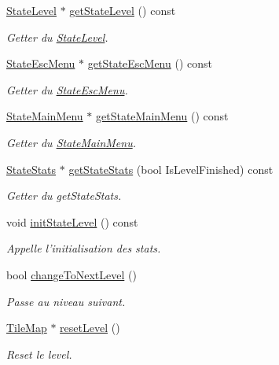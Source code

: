 \begin{DoxyCompactItemize}
\hyperlink{class_state_level}{State\+Level} $\ast$ \hyperlink{class_jeu_a2632dcd588e4cfb6cc38076cb807190c}{get\+State\+Level} () const 
\begin{DoxyCompactList}\small\item\em Getter du \hyperlink{class_state_level}{State\+Level}. \end{DoxyCompactList}\item 
\hyperlink{class_state_esc_menu}{State\+Esc\+Menu} $\ast$ \hyperlink{class_jeu_af4e8d3d39a32c20fed3e397a6e2cd939}{get\+State\+Esc\+Menu} () const 
\begin{DoxyCompactList}\small\item\em Getter du \hyperlink{class_state_esc_menu}{State\+Esc\+Menu}. \end{DoxyCompactList}\item 
\hyperlink{class_state_main_menu}{State\+Main\+Menu} $\ast$ \hyperlink{class_jeu_a09945f1c10ce230032fcdc3f25d19171}{get\+State\+Main\+Menu} () const 
\begin{DoxyCompactList}\small\item\em Getter du \hyperlink{class_state_main_menu}{State\+Main\+Menu}. \end{DoxyCompactList}\item 
\hyperlink{class_state_stats}{State\+Stats} $\ast$ \hyperlink{class_jeu_a5410b8b324962476890c9a123fc70d90}{get\+State\+Stats} (bool Is\+Level\+Finished) const 
\begin{DoxyCompactList}\small\item\em Getter du get\+State\+Stats. \end{DoxyCompactList}\item 
void \hyperlink{class_jeu_a8bba4f66ac8ea96d51bf889a55e93ffe}{init\+State\+Level} () const 
\begin{DoxyCompactList}\small\item\em Appelle l'initialisation des stats. \end{DoxyCompactList}\item 
bool \hyperlink{class_jeu_a8be6f5df4a2571ded83690a842b8f962}{change\+To\+Next\+Level} ()
\begin{DoxyCompactList}\small\item\em Passe au niveau suivant. \end{DoxyCompactList}\item 
\hyperlink{class_tile_map}{Tile\+Map} $\ast$ \hyperlink{class_jeu_a596d11f5941768eb94a71ffedabdfd03}{reset\+Level} ()
\begin{DoxyCompactList}\small\item\em Reset le level. \end{DoxyCompactList}\item 

\end{DoxyCompactItemize}
